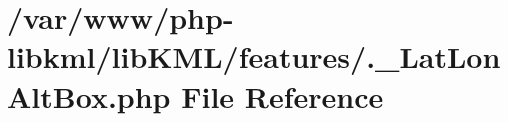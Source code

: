 \hypertarget{_8__LatLonAltBox_8php}{
\section{/var/www/php-\/libkml/libKML/features/.\_\-LatLonAltBox.php File Reference}
\label{d8/d26/_8__LatLonAltBox_8php}
}
